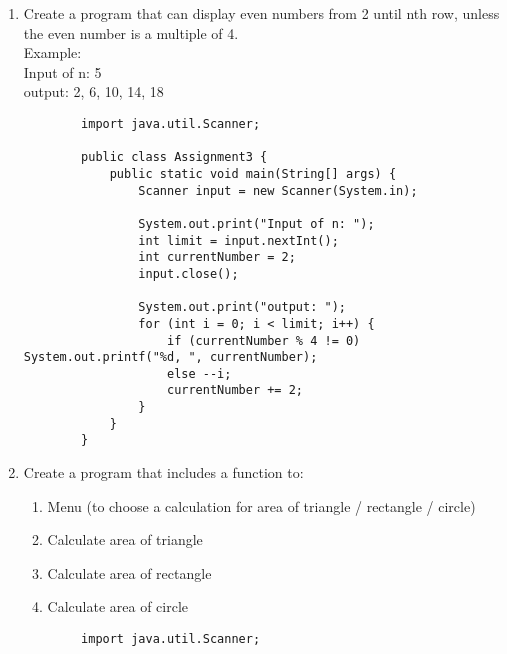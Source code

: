 \documentclass[12pt,titlepage]{article}
\begin{document}
\begin{enumerate}
\begin{verbatim}
                }
                System.out.printf("It takes %d month to reach the target of %,.0f\n", month, target);
            }
        }
    \end{verbatim}
    \item Create a program that can display even numbers from 2 until nth row, unless the even number is a multiple of 4. \mbox{}\\
    Example: \mbox{}\\
    Input of n: 5 \mbox{}\\
    output: 2, 6, 10, 14, 18
    \begin{verbatim}
        import java.util.Scanner;

        public class Assignment3 {
            public static void main(String[] args) {
                Scanner input = new Scanner(System.in);

                System.out.print("Input of n: ");
                int limit = input.nextInt();
                int currentNumber = 2;
                input.close();
                
                System.out.print("output: ");
                for (int i = 0; i < limit; i++) {
                    if (currentNumber % 4 != 0) System.out.printf("%d, ", currentNumber); 
                    else --i; 
                    currentNumber += 2;
                }
            }
        }
    \end{verbatim}
    \item Create a program that includes a function to:
    \begin{enumerate}
        \item Menu (to choose a calculation for area of triangle / rectangle / circle)
        \item Calculate area of triangle
        \item Calculate area of rectangle
        \item Calculate area of circle
    \end{enumerate}
    \begin{verbatim}
        import java.util.Scanner;


\end{verbatim}
\end{enumerate}
\end{document}
